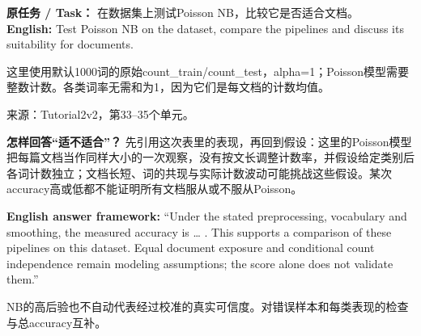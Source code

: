 

\textbf{原任务 / Task：} 在数据集上测试Poisson NB，比较它是否适合文档。\\

\textbf{English:} Test Poisson NB on the dataset, compare the pipelines and discuss its suitability for documents.


这里使用默认1000词的原始count\_train/count\_test，alpha=1；Poisson模型需要整数计数。各类词率无需和为1，因为它们是每文档的计数均值。


来源：Tutorial2v2，第33–35个单元。








\textbf{怎样回答“适不适合”？} 先引用这次表里的表现，再回到假设：这里的Poisson模型把每篇文档当作同样大小的一次观察，没有按文长调整计数率，并假设给定类别后各词计数独立；文档长短、词的共现与实际计数波动可能挑战这些假设。某次accuracy高或低都不能证明所有文档服从或不服从Poisson。


\textbf{English answer framework:} “Under the stated preprocessing, vocabulary and smoothing, the measured accuracy is … . This supports a comparison of these pipelines on this dataset. Equal document exposure and conditional count independence remain modeling assumptions; the score alone does not validate them.”


NB的高后验也不自动代表经过校准的真实可信度。对错误样本和每类表现的检查与总accuracy互补。











